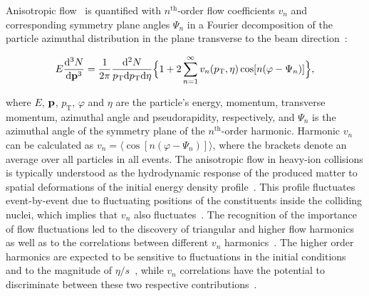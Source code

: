 Anisotropic flow~\cite{Ollitrault:1992bk} is quantified with $n^{\mathrm{th}}$-order flow coefficients $v_n$ and corresponding symmetry plane angles $\Psi_n$ in a Fourier decomposition of the particle azimuthal distribution in the plane transverse to the beam direction~\cite{Voloshin:1994mz,Poskanzer:1998yz}:

\begin{equation}
E\frac{\mathrm{d}^3N}{\mathrm{d}\bold{p}^3} = \frac{1}{2\pi}\frac{\mathrm{d}^2N}{p_{\mathrm{T}}\mathrm{d}p_{\mathrm{T}}\mathrm{d}\eta} \Big\{1 + 2\sum_{n=1}^{\infty} v_n(p_{\mathrm{T}},\eta) \cos[n(\varphi - \Psi_n)]\Big\},
\label{Eq:Fourier}
\end{equation}

\noindent where $E$, $\bold{p}$, $p_{\mathrm{T}}$, $\varphi$ and $\eta$ are the particle's energy, momentum, transverse momentum, azimuthal angle and pseudorapidity, respectively, and $\Psi_n$ is the azimuthal angle of the symmetry plane of the $n^{\mathrm{th}}$-order harmonic. Harmonic $v_n$ can be calculated as $v_{n} = \langle{\cos[n(\varphi - \Psi_n)]}\rangle$, where the brackets denote an average over all particles in all events.
The anisotropic flow in heavy-ion collisions is typically understood as the hydrodynamic response of the produced matter to spatial deformations of the initial energy density profile~\cite{Floerchinger:2013tya}.
This profile fluctuates event-by-event due to fluctuating positions of the constituents inside the colliding nuclei, which implies that $v_n$ also fluctuates~\cite{Miller:2003kd,Alver:2006wh}.
The recognition of the importance of flow fluctuations led to the discovery of triangular and higher flow harmonics~\cite{Alver:2010gr,ALICE:2011ab} as well as to the correlations between different $v_{n}$ harmonics~\cite{Niemi:2012aj,Aad:2014fla}.
The higher order harmonics are expected to be sensitive to fluctuations in the initial conditions and to the magnitude of $\eta/s$~\cite{Alver:2010dn,Luzum:2012wu}, while $v_{n}$ correlations have the potential to discriminate between these two respective contributions~\cite{Niemi:2012aj}.

